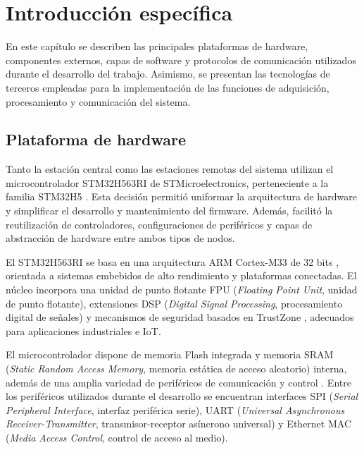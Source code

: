 \chapter{Introducción específica}
\label{Chapter2}

En este capítulo se describen las principales plataformas de hardware, componentes externos, capas de software y protocolos de comunicación utilizados durante el desarrollo del trabajo. Asimismo, se presentan las tecnologías de terceros empleadas para la implementación de las funciones de adquisición, procesamiento y comunicación del sistema.


\section{Plataforma de hardware}

Tanto la estación central como las estaciones remotas del sistema utilizan el microcontrolador STM32H563RI de STMicroelectronics, perteneciente a la familia STM32H5 \cite{STM32H563,STMicroelectronics,STM32H5}. Esta decisión permitió uniformar la arquitectura de hardware y simplificar el desarrollo y mantenimiento del firmware. Además, facilitó la reutilización de controladores, configuraciones de periféricos y capas de abstracción de hardware entre ambos tipos de nodos.

El STM32H563RI se basa en una arquitectura ARM Cortex-M33 de 32 bits \cite{CortexM33}, orientada a sistemas embebidos de alto rendimiento y plataformas conectadas. El núcleo incorpora una unidad de punto flotante FPU (\textit{Floating Point Unit}, unidad de punto flotante), extensiones DSP (\textit{Digital Signal Processing}, procesamiento digital de señales) y mecanismos de seguridad basados en TrustZone \cite{STM32H5,STM32H563_RefManual}, adecuados para aplicaciones industriales e IoT.

El microcontrolador dispone de memoria Flash integrada y memoria SRAM (\textit{Static Random Access Memory}, memoria estática de acceso aleatorio) interna, además de una amplia variedad de periféricos de comunicación y control \cite{STM32H563}. Entre los periféricos utilizados durante el desarrollo se encuentran interfaces SPI (\textit{Serial Peripheral Interface}, interfaz periférica serie), UART (\textit{Universal Asynchronous Receiver-Transmitter}, transmisor-receptor asíncrono universal) y Ethernet MAC (\textit{Media Access Control}, control de acceso al medio).


